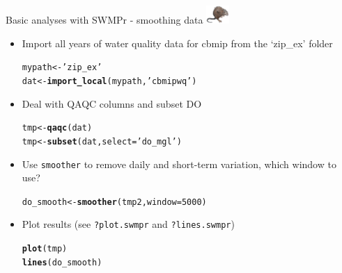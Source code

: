 \documentclass[xcolor=dvipsnames,serif]{beamer}\usepackage[]{graphicx}\usepackage[]{color}
\makeatletter
\newcommand{\hlnum}[1]{\textcolor[rgb]{0.686,0.059,0.569}{#1}}%
\newcommand{\hlstr}[1]{\textcolor[rgb]{0.192,0.494,0.8}{#1}}%
\newcommand{\hlstd}[1]{\textcolor[rgb]{0.345,0.345,0.345}{#1}}%
\newcommand{\hlkwb}[1]{\textcolor[rgb]{0.69,0.353,0.396}{#1}}%
\newcommand{\hlkwc}[1]{\textcolor[rgb]{0.333,0.667,0.333}{#1}}%
\newcommand{\hlkwd}[1]{\textcolor[rgb]{0.737,0.353,0.396}{\textbf{#1}}}%
\newenvironment{kframe}{%
 \def\at@end@of@kframe{}%
 \ifinner\ifhmode%
  \def\at@end@of@kframe{\end{minipage}}%
  \begin{minipage}{\columnwidth}%
 \fi\fi%
 \def\FrameCommand##1{\hskip\@totalleftmargin \hskip-\fboxsep
 \colorbox{shadecolor}{##1}\hskip-\fboxsep
     \hskip-\linewidth \hskip-\@totalleftmargin \hskip\columnwidth}%
 \MakeFramed {\advance\hsize-\width
   \@totalleftmargin\z@ \linewidth\hsize
   \@setminipage}}%
 {\par\unskip\endMakeFramed%
 \at@end@of@kframe}
\newenvironment{knitrout}{}{} %
\makeatother
\begin{document}
\begin{frame}[fragile]{Basic analyses with SWMPr - smoothing data \includegraphics[width = 0.065\textwidth]{imgs/swmprat.png}}
\begin{itemize}
\item {}
Import all years of water quality data for cbmip from the `zip\_ex' folder
\begin{knitrout}\scriptsize
{}\color{fgcolor}\begin{kframe}
\begin{alltt}
\hlstd{mypath} \hlkwb{<-} \hlstr{'zip_ex'}
\hlstd{dat} \hlkwb{<-} \hlkwd{import_local}\hlstd{(mypath,} \hlstr{'cbmipwq'}\hlstd{)}
\end{alltt}
\end{kframe}
\end{knitrout}
\vspace{0.1in}
\item {}
Deal with QAQC columns and subset DO
\begin{knitrout}\scriptsize
{}\color{fgcolor}\begin{kframe}
\begin{alltt}
\hlstd{tmp} \hlkwb{<-} \hlkwd{qaqc}\hlstd{(dat)}
\hlstd{tmp} \hlkwb{<-} \hlkwd{subset}\hlstd{(dat,} \hlkwc{select} \hlstd{=} \hlstr{'do_mgl'}\hlstd{)}
\end{alltt}
\end{kframe}
\end{knitrout}
\vspace{0.1in}
\item {}
Use \texttt{smoother} to remove daily and short-term variation, which window to use?
\begin{knitrout}\scriptsize
{}\color{fgcolor}\begin{kframe}
\begin{alltt}
\hlstd{do_smooth} \hlkwb{<-} \hlkwd{smoother}\hlstd{(tmp2,} \hlkwc{window} \hlstd{=} \hlnum{5000}\hlstd{)}
\end{alltt}
\end{kframe}
\end{knitrout}
\vspace{0.1in}
\item {}
Plot results (see \texttt{?plot.swmpr} and \texttt{?lines.swmpr})
\begin{knitrout}\scriptsize
{}\color{fgcolor}\begin{kframe}
\begin{alltt}
\hlkwd{plot}\hlstd{(tmp)}
\hlkwd{lines}\hlstd{(do_smooth)}
\end{alltt}
\end{kframe}
\end{knitrout}
\end{itemize}
\end{frame}
\end{document}
